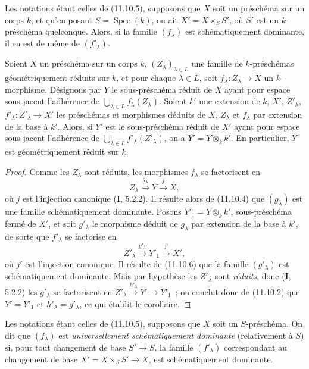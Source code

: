 \begin{proposition}[11.10.6]
\label{IV.11.10.6-fr}
Les notations étant celles de (11.10.5), supposons que $X$ soit un préschéma
sur un corps $k$, et qu'en posant $S=\operatorname{Spec}(k)$, on ait
$X'=X\times_SS'$, où $S'$ est un $k$-préschéma quelconque. Alors, si la famille
$(f_\lambda)$ est schématiquement dominante, il en est de même de
$(f'_\lambda)$.
\end{proposition}

\begin{corollary}[11.10.7]
\label{IV.11.10.7-fr}
Soient $X$ un préschéma sur un corps $k$, $(Z_\lambda)_{\lambda\in L}$ une
famille de $k$-préschémas géométriquement réduits sur $k$, et pour chaque
$\lambda\in L$, soit $f_\lambda:Z_\lambda\to X$ un $k$-morphisme. Désignons
par $Y$ le sous-préschéma réduit de $X$ ayant pour espace sous-jacent
l'adhérence de $\bigcup_{\lambda\in L}f_\lambda(Z_\lambda)$. Soient $k'$ une
extension de $k$, $X'$, $Z'_\lambda$,
$f'_\lambda:Z'_\lambda\to X'$ les préschémas et morphismes déduits de $X$,
$Z_\lambda$ et $f_\lambda$ par extension de la base à $k'$. Alors, si $Y'$ est
le sous-préschéma réduit de $X'$ ayant pour espace sous-jacent l'adhérence de
$\bigcup_{\lambda\in L}f'_\lambda(Z'_\lambda)$, on a
$Y'=Y\otimes_k k'$. En particulier, $Y$ est géométriquement réduit sur $k$.
\end{corollary}

\begin{proof}
Comme les $Z_\lambda$ sont réduits, les morphismes $f_\lambda$ se factorisent
en
\[
Z_\lambda\xrightarrow{g_\lambda}Y\xrightarrow{j}X,
\]
où $j$ est l'injection canonique ($\mathbf I$, 5.2.2). Il résulte alors de
(11.10.4) que $(g_\lambda)$ est une famille schématiquement dominante. Posons
$Y'_1=Y\otimes_k k'$, sous-préschéma fermé de $X'$, et soit $g'_\lambda$ le
morphisme déduit de $g_\lambda$ par extension de la base à $k'$, de sorte que
$f'_\lambda$ se factorise en
\[
Z'_\lambda\xrightarrow{g'_\lambda}Y'_1\xrightarrow{j'}X',
\]
où $j'$ est l'injection canonique. Il résulte de (11.10.6) que la famille
$(g'_\lambda)$ est schématiquement dominante. Mais par hypothèse les
$Z'_\lambda$ sont \emph{réduits}, donc ($\mathbf I$, 5.2.2) les
$g'_\lambda$ se factorisent en $Z'_\lambda\xrightarrow{h'_\lambda}Y'\to Y'_1$~; on conclut donc
de (11.10.2) que $Y'=Y'_1$ et $h'_\lambda=g'_\lambda$, ce qui établit le
corollaire.
\end{proof}

\begin{definition}[11.10.8]
\label{IV.11.10.8-fr}
Les notations étant celles de (11.10.5), supposons que $X$ soit un
$S$-préschéma. On dit que $(f_\lambda)$ est \emph{universellement
schématiquement dominante} (relativement à $S$) si, pour tout changement de
base $S'\to S$, la famille $(f'_\lambda)$ correspondant au changement de base
$X'=X\times_SS'\to X$, est schématiquement dominante.
\end{definition}

